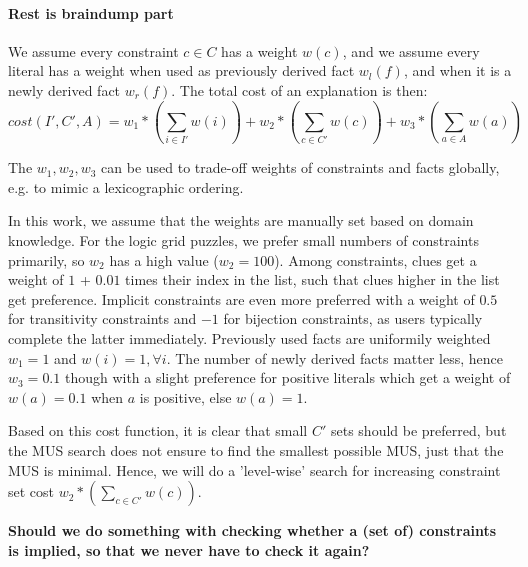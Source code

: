 \paragraph{Rest is braindump part}
We assume every constraint $c \in C$ has a weight $w(c)$, and we assume every literal has a weight when used as previously derived fact $w_l(f)$, and when it is a newly derived fact $w_r(f)$. The total cost of an explanation is then:
$$ cost(I', C', A) = w_1*(\sum_{i \in I'} w(i)) + w_2*(\sum_{c \in C'} w(c)) + w_3*(\sum_{a \in A} w(a))$$

The $w_1, w_2, w_3$ can be used to trade-off weights of constraints and facts globally, e.g. to mimic a lexicographic ordering.

In this work, we assume that the weights are manually set based on domain knowledge. For the logic grid puzzles, we prefer small numbers of constraints primarily, so $w_2$ has a high value ($w_2=100$). Among constraints, clues get a weight of $1$ + $0.01$ times their index in the list, such that clues higher in the list get preference. Implicit constraints are even more preferred with a weight of $0.5$ for transitivity constraints and $-1$ for bijection constraints, as users typically complete the latter immediately.
Previously used facts are uniformily weighted $w_1=1$ and $w(i)=1, \forall i$. The number of newly derived facts matter less, hence $w_3=0.1$ though with a slight preference for positive literals which get a weight of $w(a)=0.1$ when $a$ is positive, else $w(a)=1$.

Based on this cost function, it is clear that small $C'$ sets should be preferred, but the MUS search does not ensure to find the smallest possible MUS, just that the MUS is minimal. Hence, we will do a 'level-wise' search for increasing constraint set cost $w_2*(\sum_{c \in C'} w(c))$.

\textbf{Should we do something with checking whether a (set of) constraints is implied, so that we never have to check it again?}


%
%
%	
%
%
%
%

